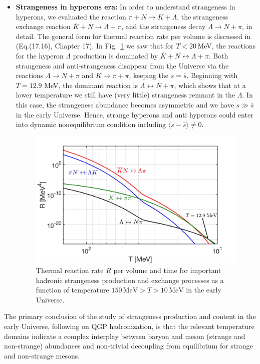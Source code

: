 \documentclass[universe,article,submit,moreauthors,pdftex,a4paper]{Definitions/mdpi}
\begin{document}
\begin{itemize}


\item \textbf{Strangeness in hyperons era:}
In order to understand strangeness in hyperons, we evaluated the reaction $\pi +N\rightarrow K+\Lambda$, the strangeness exchange reaction $\overline{K}+N\rightarrow \Lambda+\pi$, and the strangeness decay $\Lambda\rightarrow N+\pi$, in detail. The general form for thermal reaction rate per volume is discussed in~\cite{Letessier:2002ony} (Eq.(17.16), Chapter 17). In Fig.~\ref{Lambda_Rate_volume.fig} we saw that for $T<20$\,MeV, the reactions for the hyperon $\Lambda$ production is dominated by $\overline{K}+N\leftrightarrow\Lambda+\pi$. Both strangeness and anti-strangeness disappear from the Universe via the reactions $\Lambda\rightarrow N+\pi$ and $K\to\pi+\pi$, keeping the $s=\bar s$. Beginning with $T=12.9$ MeV, the dominant reaction is $\Lambda\leftrightarrow N+\pi$, which shows that at a lower temperature we still have (very little) strangeness remnant in the $\Lambda$. In this case, the strangeness abundance becomes asymmetric and we have $s\gg\bar{s}$ in the early Universe. Hence, strange hyperons and anti hyperons could enter into dynamic nonequilibrium condition including $\langle s-\bar s\rangle \ne 0$.


\begin{figure}[ht]
\begin{center}
\centering
\includegraphics[width=0.8\linewidth]{./plots/NewHyperonRate_CTYang.jpg}
\caption{Thermal reaction rate $R$ per volume and time for important hadronic strangeness production and exchange processes as a function of temperature $150\,\mathrm{MeV}> T>10\,\mathrm{MeV}$ in the early Universe.}
\label{Lambda_Rate_volume.fig}
\end{center}
\end{figure}
\end{itemize}
The primary conclusion of the study of strangeness production and content in the early Universe, following on QGP hadronization, is that the relevant temperature domains indicate a complex interplay between baryon and meson (strange and non-strange) abundances and non-trivial decoupling from equilibrium for strange and non-strange mesons.
\end{document}
